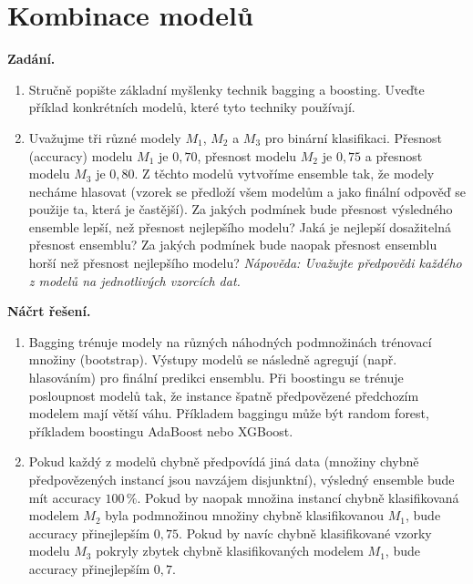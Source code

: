 \section{Kombinace modelů}

\noindent\textbf{Zadání.}\par
\begin{enumerate}
  \item Stručně popište základní myšlenky technik bagging a boosting. Uveďte příklad konkrétních modelů, které tyto techniky
    používají.
  \item Uvažujme tři různé modely $M_1$, $M_2$ a $M_3$ pro binární klasifikaci. Přesnost (accuracy) modelu $M_1$ je $0{,}70$, přesnost
    modelu $M_2$ je $0{,}75$ a přesnost modelu $M_3$ je $0{,}80$. Z těchto modelů vytvoříme ensemble tak, že modely necháme hlasovat
    (vzorek se předloží všem modelům a jako finální odpověď se použije ta, která je častější). Za jakých podmínek bude
    přesnost výsledného ensemble lepší, než přesnost nejlepšího modelu? Jaká je nejlepší dosažitelná přesnost ensemblu? Za
    jakých podmínek bude naopak přesnost ensemblu horší než přesnost nejlepšího modelu? \emph{Nápověda: Uvažujte předpovědi
    každého z modelů na jednotlivých vzorcích dat.}
\end{enumerate}

\medskip
\noindent\textbf{Náčrt řešení.}\par
\begin{enumerate}
  \item Bagging trénuje modely na různých náhodných podmnožinách trénovací množiny (bootstrap). Výstupy modelů se
    následně agregují (např. hlasováním) pro finální predikci ensemblu. Při boostingu se trénuje posloupnost modelů tak,
    že instance špatně předpovězené předchozím modelem mají větší váhu. Příkladem baggingu může být random forest,
    příkladem boostingu AdaBoost nebo XGBoost.
  \item Pokud každý z modelů chybně předpovídá jiná data (množiny chybně předpovězených instancí jsou navzájem dis\-junktní),
    výsledný ensemble bude mít accuracy $100\,\%$. Pokud by naopak množina instancí chybně klasifikovaná
    modelem $M_2$ byla podmnožinou množiny chybně klasifikovanou $M_1$, bude accuracy přinejlepším $0{,}75$. Pokud by navíc
    chybně klasifikované vzorky modelu $M_3$ pokryly zbytek chybně klasifikovaných modelem $M_1$, bude accuracy přinejlepším
    $0{,}7$.
\end{enumerate}

